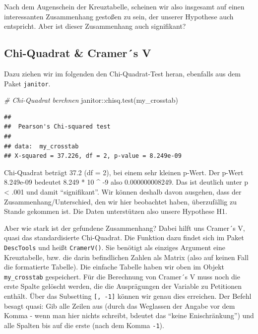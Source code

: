 \documentclass[
]{book}
\newenvironment{Shaded}{\begin{snugshade}}{\end{snugshade}}
\newcommand{\CommentTok}[1]{\textcolor[rgb]{0.56,0.35,0.01}{\textit{#1}}}
\newcommand{\FunctionTok}[1]{\textcolor[rgb]{0.00,0.00,0.00}{#1}}
\newcommand{\NormalTok}[1]{#1}
\newcommand{\SpecialCharTok}[1]{\textcolor[rgb]{0.00,0.00,0.00}{#1}}
\begin{document}
Nach dem Augenschein der Kreuztabelle, scheinen wir also insgesamt auf einen interessanten Zusammenhang gestoßen zu sein, der unserer Hypothese auch entspricht. Aber ist dieser Zusammenhang auch signifikant?

\hypertarget{chi-quadrat-cramers-v}{%
\subsection{Chi-Quadrat \& Cramer´s V}\label{chi-quadrat-cramers-v}}

Dazu ziehen wir im folgenden den Chi-Quadrat-Test heran, ebenfalls aus dem Paket \texttt{janitor}.

\begin{Shaded}
\begin{Highlighting}[]
\CommentTok{\# Chi{-}Quadrat berchnen}
\NormalTok{janitor}\SpecialCharTok{::}\FunctionTok{chisq.test}\NormalTok{(my\_crosstab)}
\end{Highlighting}
\end{Shaded}

\begin{verbatim}
## 
##  Pearson's Chi-squared test
## 
## data:  my_crosstab
## X-squared = 37.226, df = 2, p-value = 8.249e-09
\end{verbatim}

Chi-Quadrat beträgt 37.2 (df = 2), bei einem sehr kleinen p-Wert. Der p-Wert 8.249e-09 bedeutet 8.249 * 10 \^{} -9 also 0.000000008249. Das ist deutlich unter p \textless{} .001 und damit ``signifikant''. Wir können deshalb davon ausgehen, dass der Zusammenhang/Unterschied, den wir hier beobachtet haben, überzufällig zu Stande gekommen ist. Die Daten unterstützen also unsere Hypothese H1.

Aber wie stark ist der gefundene Zusammenhang? Dabei hilft uns Cramer´s V, quasi das standardisierte Chi-Quadrat. Die Funktion dazu findet sich im Paket \texttt{DescTools} und heißt \texttt{CramerV()}. Sie benötigt als einziges Argument eine Kreuztabelle, bzw. die darin befindlichen Zahlen als Matrix (also auf keinen Fall die formatierte Tabelle). Die einfache Tabelle haben wir oben im Objekt \texttt{my\_crosstab} gespeichert. Für die Berechnung von Cramer´s V muss noch die erste Spalte gelöscht werden, die die Ausprägungen der Variable zu Petitionen enthält. Über das Subsetting \texttt{{[},\ -1{]}} können wir genau dies erreichen. Der Befehl besagt quasi: Gib alle Zeilen aus (durch das Weglassen der Angabe vor dem Komma - wenn man hier nichts schreibt, bdeutet das ``keine Enischränkung'') und alle Spalten bis auf die erste (nach dem Komma \texttt{-1}).
\end{document}
